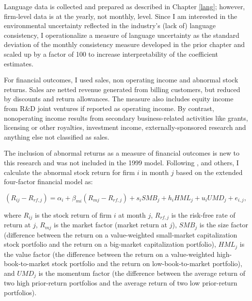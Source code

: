 Language data is collected and prepared as described in Chapter \ref{lang}; however, firm-level data is at the yearly, not monthly, level. Since I am interested in the environmental uncertainty reflected in the industry's (lack of) language consistency, I operationalize a measure of language uncertainty as the standard deviation of the monthly consistency measure developed in the prior chapter and scaled up by a factor of 100 to increase interpretability of the coefficient estimates.

For financial outcomes, I used sales, non operating income and abnormal stock returns. Sales are netted revenue generated from billing customers, but reduced by discounts and return allowances. The measure also includes equity income from R\&D joint ventures if reported as operating income. By contrast, nonoperating income results from secondary business-related activities like grants, licensing or other royalties, investment income, externally-sponsored research and anything else not classified as sales.

The inclusion of abnormal returns as a measure of financial outcomes is new to this research and was not included in the 1999 model. Following \citet{srinivasan2009}, \citet{xiong2013} and others, I calculate the abnormal stock return for firm $i$ in month $j$ based on the extended \citet{carhart1997} four-factor financial model as:

\begin{equation}\label{ff}
(R_{ij}-R_{rf,j}) = \alpha_i + \beta_{mi}(R_{mj}-R_{rf,j}) + s_iSMB_j + h_iHML_j + u_iUMD_j + e_{i,j},
\end{equation}

\noindent where $R_{ij}$ is the stock return of firm $i$ at month $j$, $R_{rf,j}$ is the risk-free rate of return at $j$, $R_{mj}$ is the market factor (market return at $j$), $SMB_j$ is the size factor (difference between the return on a value-weighted small-market capitalization stock portfolio and the return on a big-market capitalization portfolio), $HML_j$ is the value factor (the difference between the return on a value-weighted high-book-to-market stock portfolio and the return on low-book-to-market portfolio), and $UMD_j$ is the momentum factor (the difference between the average return of two high prior-return portfolios and the average return of two low prior-return portfolios).

